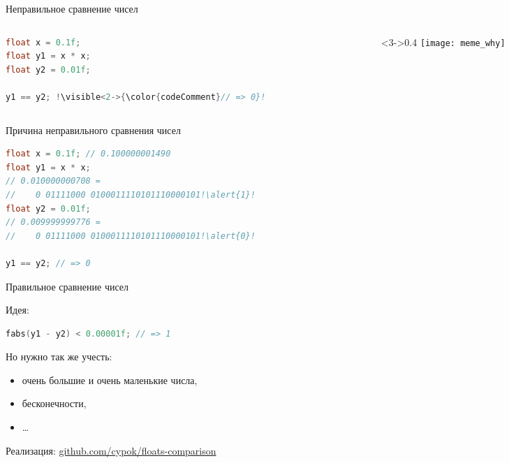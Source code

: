 \begin{frame}[fragile]{Неправильное сравнение чисел}

  \begin{columns}[onlytextwidth,c]
    \begin{column}{0.6\textwidth}
      \begin{lstlisting}[language=C,escapechar=\!]
float x = 0.1f;
float y1 = x * x;
float y2 = 0.01f;

y1 == y2; !\visible<2->{\color{codeComment}// => 0}!
      \end{lstlisting}
    \end{column}

    \begin{column}<3->{0.4\textwidth}
      \texttt{[image: meme\_why]}
    \end{column}

  \end{columns}

\end{frame}

\begin{frame}[fragile]{Причина неправильного сравнения чисел}

  \begin{lstlisting}[language=C,escapechar=\!]
float x = 0.1f; // 0.100000001490
float y1 = x * x;
// 0.010000000708 =
//    0 01111000 0100011110101110000101!\alert{1}!
float y2 = 0.01f;
// 0.009999999776 =
//    0 01111000 0100011110101110000101!\alert{0}!

y1 == y2; // => 0
  \end{lstlisting}

\end{frame}

\begin{frame}[fragile]{Правильное сравнение чисел}

  Идея:
  \begin{lstlisting}[language=C]
fabs(y1 - y2) < 0.00001f; // => 1
  \end{lstlisting}

  \pause

  Но нужно так же учесть:
  \begin{itemize}
    \item очень большие и очень маленькие числа,
    \item бесконечности,
    \item \ldots
  \end{itemize}

  Реализация: \href{%
    https://github.com/cypok/floats-comparison%
  }{%
    github.com/cypok/floats-comparison
  }

\end{frame}


